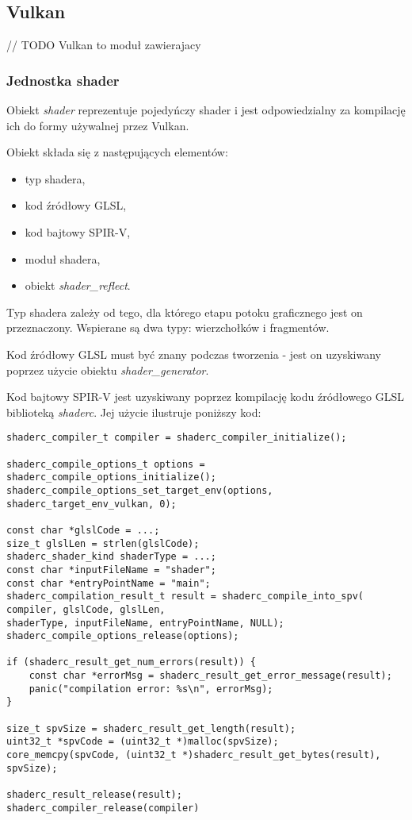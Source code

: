 \subsection{Vulkan}

// TODO Vulkan to moduł zawierajacy 

\subsubsection{Jednostka shader}
Obiekt \textit{shader} reprezentuje pojedyńczy shader i jest odpowiedzialny za kompilację ich do formy używalnej przez Vulkan.

Obiekt składa się z następujących elementów:
\begin{itemize}
	\item typ shadera,
	\item kod źródłowy GLSL,
	\item kod bajtowy SPIR-V,
	\item moduł shadera,
	\item obiekt \textit{shader\_reflect}.
\end{itemize}

Typ shadera zależy od tego, dla którego etapu potoku graficznego jest on przeznaczony.
Wspierane są dwa typy: wierzchołków i fragmentów.

Kod źródłowy GLSL must być znany podczas tworzenia - jest on uzyskiwany poprzez użycie obiektu \textit{shader\_generator}.

Kod bajtowy SPIR-V jest uzyskiwany poprzez kompilację kodu źródłowego GLSL biblioteką \textit{shaderc}.
Jej użycie ilustruje poniższy kod:
\lstset{language=C}
\begin{lstlisting}
shaderc_compiler_t compiler = shaderc_compiler_initialize();

shaderc_compile_options_t options = shaderc_compile_options_initialize();
shaderc_compile_options_set_target_env(options, shaderc_target_env_vulkan, 0);

const char *glslCode = ...;
size_t glslLen = strlen(glslCode);
shaderc_shader_kind shaderType = ...;
const char *inputFileName = "shader";
const char *entryPointName = "main";
shaderc_compilation_result_t result = shaderc_compile_into_spv(
compiler, glslCode, glslLen,
shaderType, inputFileName, entryPointName, NULL);
shaderc_compile_options_release(options);

if (shaderc_result_get_num_errors(result)) {
	const char *errorMsg = shaderc_result_get_error_message(result);
	panic("compilation error: %s\n", errorMsg);
}

size_t spvSize = shaderc_result_get_length(result);
uint32_t *spvCode = (uint32_t *)malloc(spvSize);
core_memcpy(spvCode, (uint32_t *)shaderc_result_get_bytes(result), spvSize);

shaderc_result_release(result);
shaderc_compiler_release(compiler)
\end{lstlisting}

